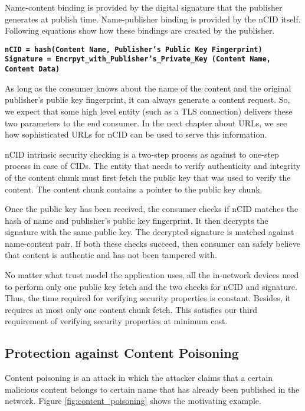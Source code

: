 Name-content binding is provided by the digital signature that the
publisher generates at publish time. Name-publisher binding is
provided by the nCID itself. Following equations show how these
bindings are created by the publisher.
\begin{center}
\texttt{\textbf{nCID = hash(Content Name, Publisher's Public Key Fingerprint)}}\\
\texttt{\textbf{Signature = Encrpyt\_with\_Publisher's\_Private\_Key (Content Name, Content Data)}}\\
\end{center}
As long as the consumer knows about the name of the content and the
original publisher's public key fingerprint, it can always generate a
content request. So, we expect that some high level entity (such as a
TLS connection) delivers these two parameters to the end consumer. In
the next chapter about URLs, we see how sophisticated URLs for nCID
can be used to serve this information.

nCID intrinsic security checking is a two-step process as against to
one-step process in case of CIDs. The entity that needs to verify
authenticity and integrity of the content chunk must first fetch the
public key that was used to verify the content. The content chunk
contains a pointer to the public key chunk.

Once the public key has been received, the consumer checks if nCID
matches the hash of name and publisher’s public key fingerprint. It
then decrypts the signature with the same public key. The decrypted
signature is matched against name-content pair. If both these checks
succeed, then consumer can safely believe that content is authentic
and has not been tampered with.

No matter what trust model the application uses, all the in-network
devices need to perform only one public key fetch and the two checks
for nCID and signature. Thus, the time required for verifying security
properties is constant. Besides, it requires at most only one content
chunk fetch. This satisfies our third requirement of verifying
security properties at minimum cost.

\subsection{Protection against Content Poisoning}
Content poisoning is an attack in which the attacker claims that a
certain malicious content belongs to certain name that has already
been published in the network. Figure \ref{fig:content_poisoning}
shows the motivating example.

